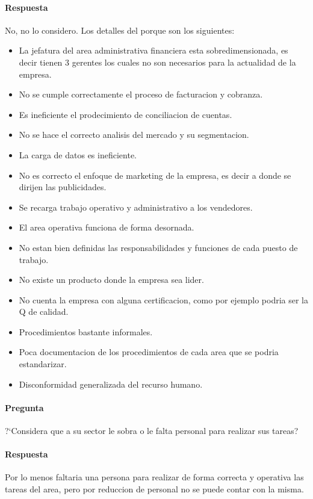 \documentclass[12pt,a4paper,spanish]{article}
\begin{document}
	\paragraph{Respuesta}
No, no lo considero.
Los detalles del porque son los siguientes:
\begin{itemize}
\item La jefatura del area administrativa financiera esta sobredimensionada, es decir tienen 3 gerentes los cuales no son necesarios para la actualidad de la empresa.
\item No se cumple correctamente el proceso de facturacion y cobranza.
\item Es ineficiente el prodecimiento de conciliacion de cuentas.
\item No se hace el correcto analisis del mercado y su segmentacion.
\item La carga de datos es ineficiente.
\item No es correcto el enfoque de marketing de la empresa, es decir a donde se dirijen las publicidades.
\item Se recarga trabajo operativo y administrativo a los vendedores.
\item El area operativa funciona de forma desornada.
\item No estan bien definidas las responsabilidades y funciones de cada puesto de trabajo.
\item No existe un producto donde la empresa sea lider.
\item No cuenta la empresa con alguna certificacion, como por ejemplo podria ser la Q de calidad.
\item Procedimientos bastante informales.
\item Poca documentacion de los procedimientos de cada area que se podria estandarizar.
\item Disconformidad generalizada del recurso humano.
\end{itemize}

	\paragraph{Pregunta}
	 ?`Considera que a su sector le sobra o le falta personal para realizar sus tareas?
	\paragraph{Respuesta}
	Por lo menos faltaria una persona para realizar de forma correcta y operativa las tareas del area, pero por reduccion de personal no se puede contar con la misma.
\end{document}
